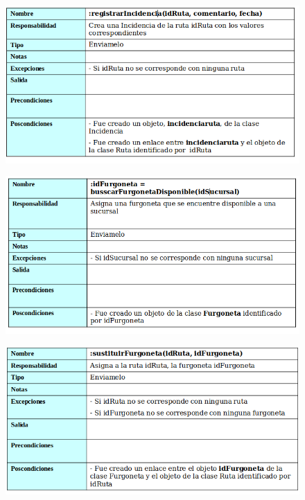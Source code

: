 \begin{figure}[H]
	\centering
	\includegraphics[width=16cm]{26}
\end{figure}
\begin{figure}[H]
	\centering
	\includegraphics[width=16cm]{27}
\end{figure}
\begin{figure}[H]
	\centering
	\includegraphics[width=16cm]{28}
\end{figure}
